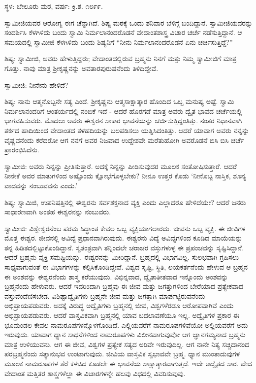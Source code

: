 \centerline{ಸ್ಥಳ: ಬೇಲೂರು ಮಠ, ವರ್ಷ: ಕ್ರಿ.ಶ. ೧೮೯೯.}

ಸ್ವಾಮೀಜಿಯವರ ಆರೋಗ್ಯ ಈಗ ಚೆನ್ನಾಗಿದೆ. ಶಿಷ್ಯ ಮಠಕ್ಕೆ ಒಂದು ಶನಿವಾರ ಬೆಳಿಗ್ಗೆ ಬಂದಿದ್ದಾನೆ. ಸ್ವಾಮೀಜಿಯವರನ್ನು ಸಂದರ್ಶಿಸಿ ಕೆಳಗಿಳಿದು ಬಂದು ಸ್ವಾಮಿ ನಿರ್ಮಲಾನಂದರೊಡನೆ ವೇದಾಂತಶಾಸ್ತ್ರ ವಿಚಾರ ಚರ್ಚೆ ನಡೆಸುತ್ತಿದ್ದಾನೆ. ಆ ಸಮಯದಲ್ಲಿ ಸ್ವಾಮೀಜಿ ಕೆಳಗಿಳಿದು ಬಂದು ಶಿಷ್ಯನಿಗೆ “ನೀನು ನಿರ್ಮಲಾನಂದರೊಡನೆ ಏನು ಚರ್ಚಿಸುತ್ತಿದ್ದೆ?”

ಶಿಷ್ಯ: ಸ್ವಾಮೀಜಿ, ಅವರು ಹೇಳುತ್ತಿದ್ದರು; ವೇದಾಂತದಲ್ಲಿರುವ ಬ್ರಹ್ಮನು ನಿನಗೆ ಮತ್ತು ನಿಮ್ಮ ಸ್ವಾಮೀಜಿಗೆ ಮಾತ್ರ ಗೊತ್ತು. ನಾವು ಮಾತ್ರ ಶ‍್ರೀಕೃಷ್ಣನನ್ನು ಅವತಾರಪುರುಷನೆಂದು ತಿಳಿದಿದ್ದೇವೆ.

ಸ್ವಾಮೀಜಿ: ನೀನೇನು ಹೇಳಿದೆ?

ಶಿಷ್ಯ: ನಾನು ಆತ್ಮನೊಬ್ಬನೇ ಸತ್ಯ ಎಂದೆ. ಶ‍್ರೀಕೃಷ್ಣನು ಆತ್ಮಸಾಕ್ಷಾತ್ಕಾರ ಹೊಂದಿದ ಒಬ್ಬ ಮನುಷ್ಯ ಅಷ್ಟೆ. ಸ್ವಾಮಿ ನಿರ್ಮಲಾನಂದರಿಗೆ ಆಂತರ್ಯದಲ್ಲಿ ನಂಬಿಕೆ ಇದೆ - ಆದರೆ ಹೊರಗಡೆ ಮಾತ್ರ ಅವರು ದ್ವೈತ ಭಾವದ ಚರ್ಚೆಯಲ್ಲಿ ಭಾಗವಹಿಸುವರು. ಮೊದಲು ಅವರು ಈಶ್ವರನ ಸಾಕಾರ ಭಾವನೆಯನ್ನು ಚರ್ಚಿಸುತ್ತಿದ್ದಂತಿತ್ತು. ನಂತರ ನಿಧಾನವಾಗಿ ತರ್ಕದ ಹಾದಿಯಿಂದ ವೇದಾಂತದ ತಳಹದಿಯನ್ನು ಬಲಪಡಿಸಲು ಯತ್ನಿಸಿದಂತಿತ್ತು. ಆದರೆ ಯಾವಾಗ ಅವರು ನನ್ನನ್ನು ವೈಷ್ಣವನೆಂದು ಕರೆದರೋ ಆಗ ನನಗೆ ಅವರ ನಿಜವಾದ ಉದ್ದೇಶವೇ ಮರೆತುಹೋಗಿ ಅವರೊಡನೆ ಬಿಸಿ ಬಿಸಿ ಚರ್ಚೆ ಪ್ರಾರಂಭಿಸಿದೆನು.

ಸ್ವಾಮೀಜಿ: ಅವರು ನಿನ್ನನ್ನು ಪ್ರೀತಿಸುತ್ತಾರೆ. ಅದಕ್ಕೆ ನಿನ್ನನ್ನು ಪೀಡಿಸುವುದರ ಮೂಲಕ ಸಂತೋಷಿಸುತ್ತಾರೆ. ಆದರೆ ನೀನೇಕೆ ಅವರ ಮಾತುಗಳಿಂದ ಅಷ್ಟೊಂದು ಕ್ಷೋಭೆಗೊಳ್ಳಬೇಕು? ನೀನೂ ಉತ್ತರ ಕೊಡು ‘ನೀನೊಬ್ಬ ನಾಸ್ತಿಕ, ಶೂನ್ಯ ವಾದವನ್ನು ನಂಬುವವನು ಎಂದು.’

ಶಿಷ್ಯ: ಸ್ವಾಮಿಜಿ, ಉಪನಿಷತ್ತಿನಲ್ಲಿ ಈಶ್ವರನು ಸರ್ವಶಕ್ತನಾದ ವ್ಯಕ್ತಿ ಎಂದು ಎಲ್ಲಾದರೂ ಹೇಳಿದೆಯೇ? ಆದರೆ ಜನರು ಸಾಧಾರಣವಾಗಿ ಅಂತಹ ಈಶ್ವರನನ್ನು ನಂಬುವರು.

ಸ್ವಾಮೀಜಿ: ವಿಶ್ವೇಶ್ವರನೆಂಬ ಪರಮ ಸಿದ್ಧಾಂತ ಕೇವಲ ಒಬ್ಬ ವ್ಯಕ್ತಿಯಾಗಲಾರದು. ಜೀವನು ಒಬ್ಬ ವ್ಯಕ್ತಿ. ಈ ಜೀವಿಗಳ ಮೊತ್ತ ಈಶ್ವರ. ಜೀವನಲ್ಲಿ ಅವಿದ್ಯೆ ಪ್ರಧಾನವಾಗಿರುವುದು. ಈಶ್ವರನು ವಿದ್ಯೆ ಅವಿದ್ಯೆಗಳಿಂದ ಕೂಡಿದ ಮಾಯೆಯನ್ನು ತನ್ನ ಹಿಡಿತದಲ್ಲಿಟ್ಟುಕೊಂಡಿದ್ದಾನೆ. ಸ್ವತಂತ್ರವಾಗಿ ತನ್ನಿಂದಲೇ ಚರಾಚರ ವಸ್ತುಗಳುಳ್ಳ ಈ ಪ್ರಪಂಚವನ್ನು ಸೃಷ್ಟಿಸಿದ್ದಾನೆ. ಆದರೆ ಬ್ರಹ್ಮನು ವ್ಯಕ್ತಿ ಸಮಷ್ಟಿಯನ್ನು, ಈಶ್ವರನನ್ನು ಮೀರಿದ್ದಾನೆ. ಬ್ರಹ್ಮದಲ್ಲಿ ವಿಭಾಗವಿಲ್ಲ. ಸುಲಭವಾಗಿ ಗ್ರಹಿಸಲು ಸಾಧ್ಯವಾಗುವಂತೆ ಈ ವಿಭಾಗಗಳನ್ನು ಕಲ್ಪಿಸಿಕೊಂಡಿದ್ದೇವೆ. ವಿಶ್ವದ ಸೃಷ್ಟಿ, ಸ್ಥಿತಿ, ಲಯಕರ್ತನೆಂದು ಹೇಳುವ ಆ ಬ್ರಹ್ಮನ ಈ ಅಂಶವನ್ನು ಈಶ್ವರನೆಂದು ಶಾಸ್ತ್ರ ಕರೆಯುವುದು. ವಿಭಿನ್ನವಾದ, ದ್ವೈತಾತೀತವಾದ ಇನ್ನೊಂದು ಅಂಶವನ್ನು ಬ್ರಹ್ಮನೆಂದು ಹೇಳುವರು. ಆದರೆ ಇದರಿಂದಾಗಿ ಬ್ರಹ್ಮವು ಈ ಜೀವ ಮತ್ತು ಜಗತ್ತುಗಳಿಂದ ಬೇರೆಯಾದ ಪ್ರತ್ಯೇಕವಾದ ವಸ್ತುವೆಂದೆಣಿಸಬೇಡ. ವಿಶಿಷ್ಟಾದ್ವೈತಿಗಳು ಬ್ರಹ್ಮನೇ ಜೀವ ಮತ್ತು ಜಗತ್ತಾಗಿ ಮಾರ್ಪಟ್ಟಿರುವನೆಂದು ಅಭಿಪ್ರಾಯಪಡುವರು. ಅದಕ್ಕೆ ವಿರುದ್ಧ ಅದ್ವೈತಿಗಳು ಬ್ರಹ್ಮನಲ್ಲಿ ಜೀವ, ವಿಶ್ವಗಳೆರಡೂ ಆರೋಪವಾಗಿವೆ ಎಂದು ಅಭಿಪ್ರಾಯಪಡುವರು. ಆದರೆ ವಾಸ್ತವಿಕವಾಗಿ ಬ್ರಹ್ಮನಲ್ಲಿ ಯಾವ ಬದಲಾವಣೆಯೂ ಇಲ್ಲ. ಅದ್ವೈತಿಗಳ ಪ್ರಕಾರ ಈ ಭೂಮಂಡಲ ಕೇವಲ ನಾಮರೂಪಗಳನ್ನೊಳಗೊಂಡಿದೆ. ಎಲ್ಲಿಯವರೆಗೆ ನಾಮರೂಪಗಳಿವೆಯೋ ಅಲ್ಲಿಯವರೆಗೆ ಅದು ಇರುವುದು. ಯಾವಾಗ ಧ್ಯಾನ ಸಾಧನೆಗಳಿಂದ ನಾಮರೂಪಗಳು ವಿಲೀನವಾಗುವುವೋ ಆಗ ಜ್ಞಾನಗಮ್ಯನಾದ ಬ್ರಹ್ಮನು ಮಾತ್ರ ಉಳಿಯುವನು. ಆಗ ಈ ಜೀವ, ವಿಶ್ವಗಳ ಪ್ರತ್ಯೇಕ ಸತ್ಯದ ಅರಿವೇ ಇರುವುದಿಲ್ಲ. ಆಗ ನಾನೇ ನಿತ್ಯ ಸಚ್ಚಿದಾನಂದ ಪರಬ್ರಹ್ಮನೆಂದು ಸತ್ಯಾನುಭವ ಉಂಟಾಗುವುದು. ಜೀವಿಯ ವಾಸ್ತವಿಕ ಸ್ವಭಾವವೇ ಬ್ರಹ್ಮ. ಧ್ಯಾನ ಮುಂತಾದುವುಗಳ ಮೂಲಕ ನಾಮರೂಪಗಳ ತೆರೆ ಕಳಚಿದ ಕೂಡಲೇ ಈ ಭಾವನೆಯ ಸಾಕ್ಷಾತ್ಕಾರವಾಗುತ್ತದೆ. ಇದೇ ಅದ್ವೈತದ ಸಾರ. ವೇದ ವೇದಾಂತ ಮತ್ತಿತರ ಶಾಸ್ತ್ರಗಳೆಲ್ಲಾ ಈ ವಿಚಾರಗಳನ್ನೇ ಹಲವು ವಿಧದಲ್ಲಿ ವಿವರಿಸುವುವು.

